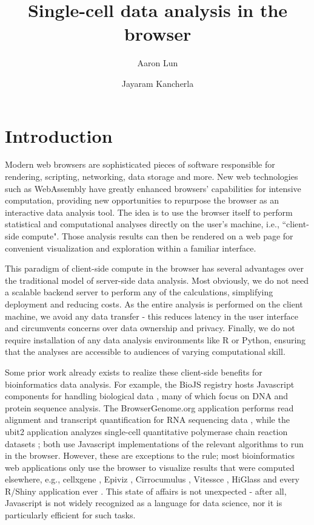 \documentclass{article}
\title{Single-cell data analysis in the browser}
\author[1]{Aaron Lun}
\affil[1]{Genentech, Inc. South San Francisco, CA}
\author[1]{Jayaram Kancherla}
\begin{document}
\maketitle

\newcommand{\jay}[1]{\textcolor{red}{#1}}

\section{Introduction}

Modern web browsers are sophisticated pieces of software responsible for rendering, scripting, networking, data storage and more.
New web technologies such as WebAssembly \cite{haas2017bringing} have greatly enhanced browsers' capabilities for intensive computation,
providing new opportunities to repurpose the browser as an interactive data analysis tool.
The idea is to use the browser itself to perform statistical and computational analyses directly on the user's machine, i.e., ``client-side compute". 
Those analysis results can then be rendered on a web page for convenient visualization and exploration within a familiar interface.

This paradigm of client-side compute in the browser has several advantages over the traditional model of server-side data analysis.
Most obviously, we do not need a scalable backend server to perform any of the calculations, simplifying deployment and reducing costs.
As the entire analysis is performed on the client machine, we avoid any data transfer - this reduces latency in the user interface and circumvents concerns over data ownership and privacy.
Finally, we do not require installation of any data analysis environments like R or Python, ensuring that the analyses are accessible to audiences of varying computational skill.

Some prior work already exists to realize these client-side benefits for bioinformatics data analysis.
For example, the BioJS registry hosts Javascript components for handling biological data \cite{gomez2013biojs}, many of which focus on DNA and protein sequence analysis.
The BrowserGenome.org application performs read alignment and transcript quantification for RNA sequencing data \cite{schmid2015browsergenome},
while the ubit2 application analyzes single-cell quantitative polymerase chain reaction datasets \cite{fan2017ubit2};
both use Javascript implementations of the relevant algorithms to run in the browser.
However, these are exceptions to the rule; most bioinformatics web applications only use the browser to visualize results that were computed elsewhere,
e.g., cellxgene \cite{megill2021cellxgene}, Epiviz \cite{chelaru2014epiviz}, Cirrocumulus \cite{cirrocumulus}, Vitessce \cite{vitessce}, HiGlass \cite{kerpedjiev2018higlass} and every R/Shiny application ever \cite{shiny}.
This state of affairs is not unexpected - 
after all, Javascript is not widely recognized as a language for data science, nor it is particularly efficient for such tasks.
\end{document}
